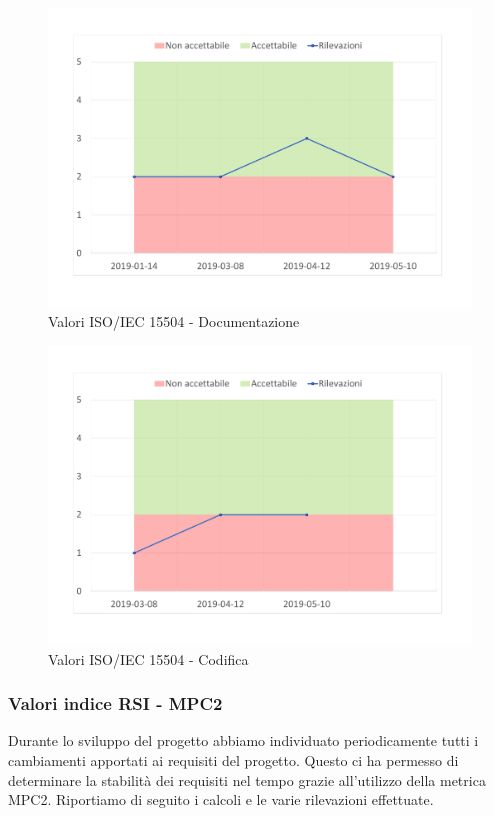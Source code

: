 \begin{figure}[H]
	\centering
	\includegraphics[scale=0.6]{images/resoconto/Documentazione.pdf}
	\caption{Valori ISO/IEC 15504 - Documentazione}	
\end{figure}


\begin{figure}[H]
	\centering
	\includegraphics[scale=0.6]{images/resoconto/Codifica.pdf}
	\caption{Valori ISO/IEC 15504 - Codifica}	
\end{figure}
\newpage
\subsubsection{Valori indice RSI - MPC2\\}
Durante lo sviluppo del progetto abbiamo individuato periodicamente tutti i cambiamenti apportati ai requisiti del progetto. Questo ci ha permesso di determinare la stabilità dei requisiti nel tempo grazie all'utilizzo della metrica MPC2.
Riportiamo di seguito i calcoli e le varie rilevazioni effettuate.

